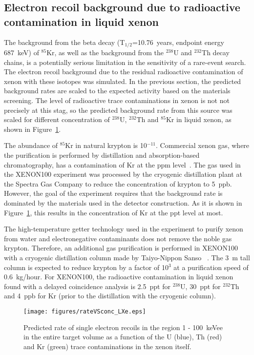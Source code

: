 \subsection{Electron recoil background due to radioactive contamination in liquid xenon}
\label{sec:LXe}

The background from the beta decay (T$_{1/2}$=10.76~years, endpoint energy 687~keV) of
$^{85}$Kr, as well as the background from the $^{238}$U and $^{232}$Th  
decay chains, is a potentially serious 
limitation in the sensitivity of a rare-event search. The electron recoil
background due to the residual radioactive contamination of 
xenon with these isotopes was simulated. In the previous section, the predicted background rates are scaled to the expected activity based on the materials screening. The level of radioactive trace contaminations in xenon is not not precisely at this stag, so the predicted background rate from this source was scaled for different  concentration of $^{238}$U, $^{232}$Th and $^{85}$Kr in liquid xenon, as shown in Figure~\ref{figLXe}.

The abundance of $^{85}$Kr in natural krypton is 10$^{-11}$. 
Commercial xenon gas, where the purification is performed by distillation and absorption-based chromatography, has a contamination of Kr at the ppm level~\cite{spectragas}. The gas
used in the XENON100 experiment was processed by the
cryogenic distillation plant at the Spectra Gas  Company to reduce the concentration of krypton to 5~ppb. However, the goal of the experiment requires that the background rate is dominated by the materials used in the detector construction. As it is shown in Figure~\ref{figLXe}, this results in the concentration of Kr at the ppt level at most.

The high-temperature getter technology used in the experiment to purify xenon
from water and electronegative contaminants does not remove the noble gas 
krypton. Therefore, an additional gas purification is performed in XENON100 with a 
cryogenic distillation column made by Taiyo-Nippon Sanso ~\cite{xmass}. The 3~m tall column is expected to reduce krypton by a factor of 10$^3$ at a purification speed of 0.6~kg/hour. 
For XENON100, the radioactive contamination in liquid xenon found with a delayed coincidence
analysis is 2.5~ppt for $^{238}$U, 30~ppt for $^{232}$Th and 4~ppb for Kr (prior to the distillation with the cryogenic column).

\begin{figure}[!h]
\begin{center}
 \texttt{[image: figures/rateVSconc\_LXe.eps]}
\caption{Predicted rate of single electron recoils in the region 1 - 100~keVee
  in the entire target volume as a function of the U (blue), Th (red) and Kr (green) trace contaminations in the xenon itself.}
\label{figLXe}
\end{center}
\end{figure}


